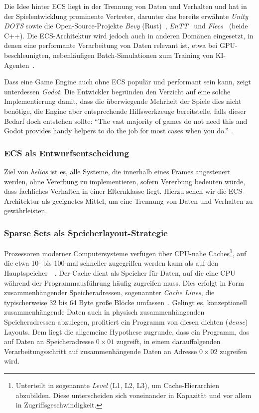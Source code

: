 Die Idee hinter ECS liegt in der Trennung von Daten und Verhalten und hat in der Spielentwicklung prominente Vertreter, darunter das bereits erwähnte \textit{Unity DOTS} sowie die Open-Source-Projekte \textit{Bevy} (Rust)~\cite{BevyProject}, \textit{EnTT}~\cite{EnttProject} und \textit{Flecs}~\cite{FlecsProject} (beide C++).
Die ECS-Architektur wird jedoch auch in anderen Domänen eingesetzt, in denen eine performante Verarbeitung von Daten relevant ist, etwa bei GPU-beschleunigten, nebenläufigen Batch-Simulationen zum Training von KI-Agenten~\cite{SRXB+23}.

Dass eine Game Engine auch ohne ECS populär und performant sein kann, zeigt unterdessen \textit{Godot}.
Die Entwickler begründen den Verzicht auf eine solche Implementierung damit, dass die überwiegende Mehrheit der Spiele dies nicht benötige, die Engine aber entsprechende Hilfswerkzeuge bereitstelle, falls dieser Bedarf doch entstehen sollte: ``The vast majority of games do not need this and Godot provides handy helpers to do the job for most cases when you do.''~\cite{GodotNoECS}.

\subsubsection{ECS als Entwurfsentscheidung}

Ziel von \textit{helios} ist es, alle Systeme, die innerhalb eines Frames angesteuert werden, ohne Vererbung zu implementieren, sofern Vererbung bedeuten würde, dass fachliches Verhalten in einer Elternklasse liegt.
Hierzu sehen wir die ECS-Architektur als geeignetes Mittel, um eine Trennung von Daten und Verhalten zu gewährleisten.

\subsubsection{Sparse Sets als Speicherlayout-Strategie}

Prozessoren moderner Computersysteme verfügen über CPU-nahe Caches\footnote{
    Unterteilt in sogenannte \textit{Level} (L1, L2, L3), um Cache-Hierarchien abzubilden.
    Diese unterscheiden sich voneinander in Kapazität und vor allem in Zugriffsgeschwindigkeit.
}, auf die etwa 10- bis 100-mal schneller zugegriffen werden kann als auf den Hauptspeicher~\cite[S.~5]{Man20}~\cite[79]{HP17}.
Der Cache dient als Speicher für Daten, auf die eine CPU während der Programmausführung häufig zugreifen muss.
Dies erfolgt in Form zusammenhängender Speicheradressen, sogenannter \textit{Cache Lines}, die typischerweise 32 bis 64 Byte große Blöcke umfassen~\cite[531]{TB23}.
Gelingt es, konzeptionell zusammenhängende Daten auch in physisch zusammenhängenden Speicheradressen abzulegen, profitiert ein Programm von diesen dichten (\textit{dense}) Layouts.
Dem liegt die allgemeine Hypothese zugrunde, dass ein Programm, das auf Daten an Speicheradresse $0\times01$ zugreift, in einem darauffolgenden Verarbeitungsschritt auf zusammenhängende Daten an Adresse $0\times02$ zugreifen wird.

